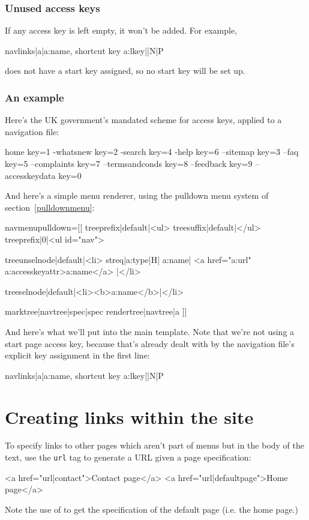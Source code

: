 \subsubsection{Unused access keys}
If any access key is left empty, it won't be added. For example,
\begin{MyVerbatim}
{{navlinks|a|{{a:name}}, shortcut key {{a:lkey}}||N|P}}
\end{MyVerbatim}
does not have a start key assigned, so no start key will be set up.

\subsubsection{An example}
Here's the UK government's mandated scheme for access keys, applied to a navigation file:
\begin{MyVerbatim}
home key=1
-whatsnew key=2
-search key=4
-help key=6
--sitemap key=3
--faq key=5
--complaints key=7
--termsandconds key=8
--feedback key=9
--accesskeydata key=0
\end{MyVerbatim}
\clearpage
And here's a simple menu renderer, using the pulldown menu system of
section~\ref{pulldownmenu}:
\begin{MyVerbatim}
navmenupulldown=[[
{{treeprefix|default|<ul>}}
{{treesuffix|default|</ul>}}
{{treeprefix|0|<ul id="nav">}}

{{treeunselnode|default|<li>
    {{streq|{{a:type}}|H|
        {{a:name}}|
        <a href="{{a:url}}" {{a:accesskeyattr}}>{{a:name}}</a>
    }}|</li>
}}

{{treeselnode|default|<li><b>{{a:name}}</b>|</li>}}

{{marktree|{{navtree}}|spec|{{spec}}}}
{{rendertree|{{navtree}}|a}}
]]
\end{MyVerbatim}
And here's what we'll put into the main template. Note that we're not using a start page access key,
because that's already dealt with by the navigation file's explicit key assignment in the first line:
\begin{MyVerbatim}
{{navlinks|a|{{a:name}}, shortcut key {{a:lkey}}||N|P}}
\end{MyVerbatim}

\section{Creating links within the site}
To specify links to other pages which aren't part of menus but in the
body of the text, use the \texttt{url} tag to generate a URL given a 
page specification:
\begin{MyVerbatim}
<a href="{{url|contact}}">Contact page</a>
<a href="{{url|{{defaultpage}}}}">Home page</a>
\end{MyVerbatim}
Note the use of  to get the specification of the default
page (i.e. the home page.)

